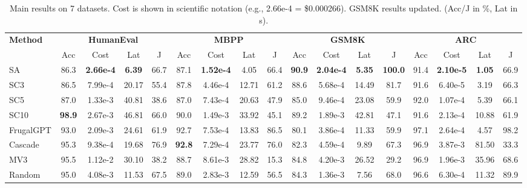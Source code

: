 \documentclass[acmsmall,screen,review,anonymous]{acmart}
\begin{document}
\begin{table}[t]
\centering
\footnotesize
\setlength{\tabcolsep}{2.0pt} %
\renewcommand{\arraystretch}{1.12}
\caption{Main results on 7 datasets. Cost is shown in scientific notation (e.g., 2.66e-4 = \$0.000266). GSM8K results updated. (Acc/J in \%, Lat in s).}
\label{tab:main_results}
\begin{tabular}{lcccc cccc cccc cccc}
\toprule
\multirow{2}{*}{\textbf{Method}} &
\multicolumn{4}{c}{\textbf{HumanEval}} &
\multicolumn{4}{c}{\textbf{MBPP}} &
\multicolumn{4}{c}{\textbf{GSM8K}} &
\multicolumn{4}{c}{\textbf{ARC}} \\
\cmidrule(lr){2-5}\cmidrule(lr){6-9}\cmidrule(lr){10-13}\cmidrule(lr){14-17}
& Acc & Cost & Lat & J & Acc & Cost & Lat & J & Acc & Cost & Lat & J & Acc & Cost & Lat & J \\
\midrule
SA                  & 86.3 & \textbf{2.66e-4} & \textbf{6.39}  & 66.7 & 87.1 & \textbf{1.52e-4} & 4.05  & 66.4 & \textbf{90.9} & \textbf{2.04e-4} & \textbf{5.35}  & \textbf{100.0} & 91.4 & \textbf{2.10e-5} & \textbf{1.05} & 66.9 \\
SC\textendash{}3    & 86.5 & 7.99e-4          & 20.17          & 55.4 & 87.8 & 4.46e-4          & 12.71 & 61.2 & 88.6 & 5.68e-4          & 14.49          & 81.7 & 91.6 & 6.40e-5          & 3.19          & 66.3 \\
SC\textendash{}5    & 87.0 & 1.33e-3          & 40.81          & 38.6 & 87.0 & 7.43e-4          & 20.63 & 47.9 & 85.0 & 9.46e-4          & 23.08          & 59.9 & 92.0 & 1.07e-4          & 5.39          & 66.1 \\
SC\textendash{}10   & \textbf{98.9} & 2.67e-3          & 46.81          & 66.0 & 90.0 & 1.49e-3          & 33.92 & 45.1 & 89.2 & 1.89e-3          & 42.81          & 47.1 & 91.6 & 2.13e-4          & 10.88         & 61.9 \\

FrugalGPT           & 93.0 & 2.09e-3          & 24.61          & 61.9 & 92.7 & 7.53e-4          & 13.83 & 86.5 & 80.1 & 3.86e-4          & 11.33          & 59.9 & 97.1 & 2.64e-4          & 4.57          & 98.2 \\
Cascade             & 95.3 & 9.38e-4          & 19.68          & 76.9 & \textbf{92.8} & 7.29e-4          & 23.77 & 76.0 & 82.3 & 4.59e-4          & 9.89           & 67.3 & 96.9 & 3.87e-3          & 81.50         & 33.3 \\
MV\textendash{}3    & 95.5 & 1.12e-2          & 30.10          & 38.2 & 88.7 & 8.61e-3          & 28.82 & 15.3 & 84.8 & 4.20e-3          & 26.52          & 29.2 & 96.9 & 1.96e-3          & 35.96         & 68.6 \\
Random              & 95.0 & 4.08e-3          & 11.53          & 67.5 & 89.0 & 2.83e-3          & 12.59 & 56.5 & 84.3 & 1.36e-3          & 7.56           & 68.0 & 96.6 & 6.30e-4          & 11.32         & 89.9 \\


\end{tabular}
\end{table}
\end{document}
